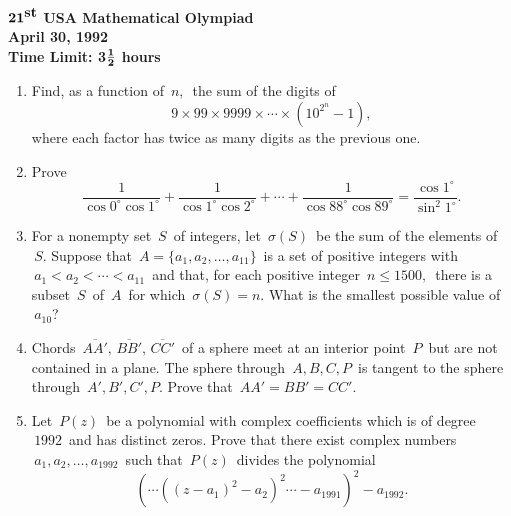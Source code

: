 \def\dg{^\circ}

\begin{center}
${\bf 21}^{\mbox{\bf st}}$ {\bf USA 
Mathematical 
Olympiad} 
\\[.1in] 
{\bf April 30, 1992}\\ 
{\bf Time Limit: 3}${{\bf 1}\over{\bf 2}}$ {\bf 
hours} 
\end{center} 
\begin{enumerate} 
\item 
Find, as a function of $\, n, \,$ the sum of the digits of 
\[ 
9 \times 99 \times 9999 \times \cdots \times \left( 10^{2^n} - 1
\right), 
\] 
where each factor has twice as many digits as the 
previous 
one. 
\item 
Prove 
\[ 
\frac{1}{\cos 0\dg \cos 1\dg} +  
\frac{1}{\cos 1\dg \cos 2\dg} + \cdots + 
\frac{1}{\cos 88\dg \cos 89\dg} = 
\frac{\cos 1\dg}{\sin^2 1\dg}. 
\] 
\item 
For a nonempty set $\, S \,$ of integers, let $\, \sigma(S) \,$ 
be the sum of the elements of $\, S$.  Suppose that 
$\, A = \{a_1, a_2, \ldots, a_{11} \} \,$ is a set of  
positive integers with $\, a_1 < a_2 < \cdots < a_{11} \,$ 
and that, for each positive integer $\, n\leq 1500, \,$ 
there is a subset  $\, S \,$ of $\, A \,$ for which 
$\, \sigma(S) = n$.   What is the smallest possible 
value of $\, a_{10}$?  
\item 
Chords $\, \overline{AA'}, \, \overline{BB'}, \, \overline{CC'} 
\,$ of a sphere meet at an interior point $\, P \,$ but are not 
contained in a plane.  The sphere through $\, A,B,C,P \,$ 
is tangent to the sphere through $\, A', B', C', P$. 
Prove that $\, AA' = BB' = CC'$. 
\item 
Let $\, P(z) \,$ be a polynomial with complex coefficients which
is of degree $\, 1992 \,$ and has distinct zeros.  Prove that 
there exist complex numbers $\, a_1, a_2, \ldots, a_{1992} \,$ 
such that $\, P(z) \, $ divides the polynomial 
\[ 
\left( \cdots \left( (z-a_1)^2 - a_2 \right)^2 \cdots - a_{1991}
\right)^2 - a_{1992}. 
\]   
\end{enumerate} 
